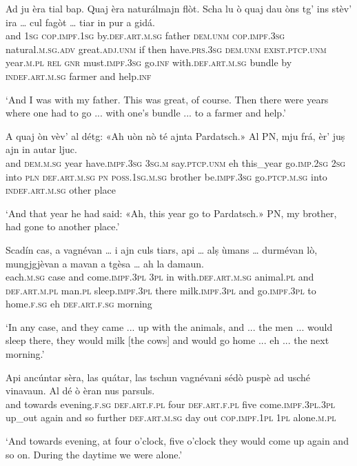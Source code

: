 \begin{linenumbers}
	\gll Ad ju èra tial bap. Quaj èra naturálmajn flòt. Scha lu ò quaj dau òns tg’ ins stèv’ ira … cul fagòt … tiar in pur a gidá.   \\
	and \textsc{1sg} \textsc{cop.impf.1sg} by.\textsc{def.art.m.sg} father \textsc{dem.unm} \textsc{cop.impf.3sg} natural.\textsc{m.sg.adv} great.\textsc{adj.unm} if then have.\textsc{prs.3sg} \textsc{dem.unm} \textsc{exist.ptcp.unm} year.\textsc{m.pl} \textsc{rel} \textsc{gnr} must.\textsc{impf.3sg} go.\textsc{inf} {} with.\textsc{def.art.m.sg} bundle {} by \textsc{indef.art.m.sg} farmer and help.\textsc{inf} \\
\end{linenumbers}
\medskip
\glt `And I was with my father. This was great, of course. Then there were years where one had to go ... with one's bundle ... to a farmer and help.'
\medskip

\begin{linenumbers}
	\gll  A quaj òn vèv’ al détg: «Ah uòn nò té ajnta Pardatsch.» Al PN, mju frá, èr’ juṣ ajn in autar ljuc.\\
and \textsc{dem.m.sg} year have.\textsc{impf.3sg} \textsc{3sg.m} say.\textsc{ptcp.unm} eh this\_year go.\textsc{imp.2sg} \textsc{2sg} into \textsc{pln} \textsc{def.art.m.sg} \textsc{pn} \textsc{poss.1sg.m.sg} brother be.\textsc{impf.3sg} go.\textsc{ptcp.m.sg} into \textsc{indef.art.m.sg} other place	\\
\end{linenumbers}
\medskip
\glt `And that year he had said: «Ah, this year go to Pardatsch.» PN, my brother, had gone to another place.'
\medskip

\begin{linenumbers}
	\gll Scadín cas, a vagnévan … i ajn culs tiars, api … alṣ ùmans … durmévan lò, mungjgjèvan a mavan a tgèsa … ah la damaun.\\
each.\textsc{m.sg} case and come.\textsc{impf.3pl} {} \textsc{3pl} in with.\textsc{def.art.m.sg} animal.\textsc{pl} and {} \textsc{def.art.m.pl} man.\textsc{pl} {} sleep.\textsc{impf.3pl} there milk.\textsc{impf.3pl} and go.\textsc{impf.3pl} to home.\textsc{f.sg} {} eh \textsc{def.art.f.sg} morning	\\
\end{linenumbers}
\medskip
\glt `In any case, and they came ... up with the animals, and ... the men ... would sleep there, they would milk [the cows] and would go home ... eh ... the next morning.'
\medskip

\begin{linenumbers}
	\gll Api ancúntar sèra, las quátar, las tschun vagnévani sédò puspè ad usché vinavaun. Al dé ò èran nus parsuls.\\
	and towards evening.\textsc{f.sg} \textsc{def.art.f.pl} four \textsc{def.art.f.pl} five come.\textsc{impf.3pl.3pl} up\_out again and so further \textsc{def.art.m.sg} day out \textsc{cop.impf.1pl} \textsc{1pl} alone.\textsc{m.pl}\\
\end{linenumbers}
\medskip
\glt `And towards evening, at four o'clock, five o'clock they would come up again and so on. During the daytime we were alone.'
\medskip

